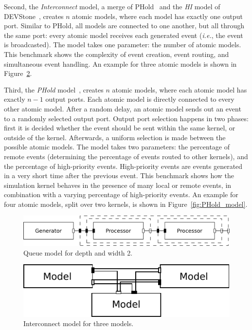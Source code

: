 Second, the \textit{Interconnect} model, a merge of PHold~\cite{PHOLD} and the \textit{HI} model of DEVStone~\cite{DEVStone}, creates $n$ atomic models, where each model has exactly one output port.
Similar to PHold, all models are connected to one another, but all through the same port: every atomic model receives each generated event (\textit{i.e.}, the event is broadcasted).
The model takes one parameter: the number of atomic models.
This benchmark shows the complexity of event creation, event routing, and simultaneous event handling.
An example for three atomic models is shown in Figure~\ref{fig:interconnect_model}.

Third, the \textit{PHold} model~\cite{PHOLD}, creates $n$ atomic models, where each atomic model has exactly $n-1$ output ports.
Each atomic model is directly connected to every other atomic model.
After a random delay, an atomic model sends out an event to a randomly selected output port.
Output port selection happens in two phases: first it is decided whether the event should be sent within the same kernel, or outside of the kernel.
Afterwards, a uniform selection is made between the possible atomic models.
The model takes two parameters: the percentage of remote events (determining the percentage of events routed to other kernels), and the percentage of high-priority events.
High-priority events are events generated in a very short time after the previous event.
This benchmark shows how the simulation kernel behaves in the presence of many local or remote events, in combination with a varying percentage of high-priority events.
An example for four atomic models, split over two kernels, is shown in Figure~\ref{fig:PHold_model}.

\begin{figure}
	\center
	\includegraphics[width=\columnwidth]{fig/queue_model_fixed.pdf}
	\caption{Queue model for depth and width 2.}
	\label{fig:queue_model}
\end{figure}
	
\begin{figure}
    \center
	\includegraphics[width=\modelfraction\columnwidth]{fig/interconnect_model.pdf}
	\caption{Interconnect model for three models.}
	\label{fig:interconnect_model}
\end{figure}


